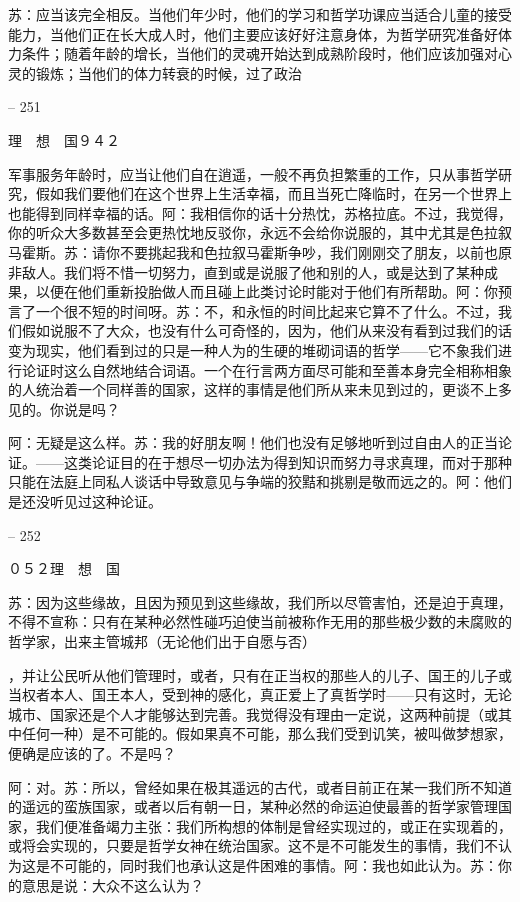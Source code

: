 \documentclass[11pt,oneside]{book}
\begin{document}
\begin{common-format}
    苏：应当该完全相反。当他们年少时，他们的学习和哲学功课应当适合儿童的接受能力，当他们正在长大成人时，他们主要应该好好注意身体，为哲学研究准备好体力条件；随着年龄的增长，当他们的灵魂开始达到成熟阶段时，他们应该加强对心灵的锻炼；当他们的体力转衰的时候，过了政治

    

-- 251

    理　想　国９４２

    军事服务年龄时，应当让他们自在逍遥，一般不再负担繁重的工作，只从事哲学研究，假如我们要他们在这个世界上生活幸福，而且当死亡降临时，在另一个世界上也能得到同样幸福的话。阿：我相信你的话十分热忱，苏格拉底。不过，我觉得，你的听众大多数甚至会更热忱地反驳你，永远不会给你说服的，其中尤其是色拉叙马霍斯。苏：请你不要挑起我和色拉叙马霍斯争吵，我们刚刚交了朋友，以前也原非敌人。我们将不惜一切努力，直到或是说服了他和别的人，或是达到了某种成果，以便在他们重新投胎做人而且碰上此类讨论时能对于他们有所帮助。阿：你预言了一个很不短的时间呀。苏：不，和永恒的时间比起来它算不了什么。不过，我们假如说服不了大众，也没有什么可奇怪的，因为，他们从来没有看到过我们的话变为现实，他们看到过的只是一种人为的生硬的堆砌词语的哲学——它不象我们进行论证时这么自然地结合词语。一个在行言两方面尽可能和至善本身完全相称相象的人统治着一个同样善的国家，这样的事情是他们所从来未见到过的，更谈不上多见的。你说是吗？

    阿：无疑是这么样。苏：我的好朋友啊！他们也没有足够地听到过自由人的正当论证。——这类论证目的在于想尽一切办法为得到知识而努力寻求真理，而对于那种只能在法庭上同私人谈话中导致意见与争端的狡黠和挑剔是敬而远之的。阿：他们是还没听见过这种论证。

    

-- 252

    ０５２理　想　国

    苏：因为这些缘故，且因为预见到这些缘故，我们所以尽管害怕，还是迫于真理，不得不宣称：只有在某种必然性碰巧迫使当前被称作无用的那些极少数的未腐败的哲学家，出来主管城邦（无论他们出于自愿与否）

    ，并让公民听从他们管理时，或者，只有在正当权的那些人的儿子、国王的儿子或当权者本人、国王本人，受到神的感化，真正爱上了真哲学时——只有这时，无论城市、国家还是个人才能够达到完善。我觉得没有理由一定说，这两种前提（或其中任何一种）是不可能的。假如果真不可能，那么我们受到讥笑，被叫做梦想家，便确是应该的了。不是吗？

    阿：对。苏：所以，曾经如果在极其遥远的古代，或者目前正在某一我们所不知道的遥远的蛮族国家，或者以后有朝一日，某种必然的命运迫使最善的哲学家管理国家，我们便准备竭力主张：我们所构想的体制是曾经实现过的，或正在实现着的，或将会实现的，只要是哲学女神在统治国家。这不是不可能发生的事情，我们不认为这是不可能的，同时我们也承认这是件困难的事情。阿：我也如此认为。苏：你的意思是说：大众不这么认为？


\end{common-format}
\end{document}
